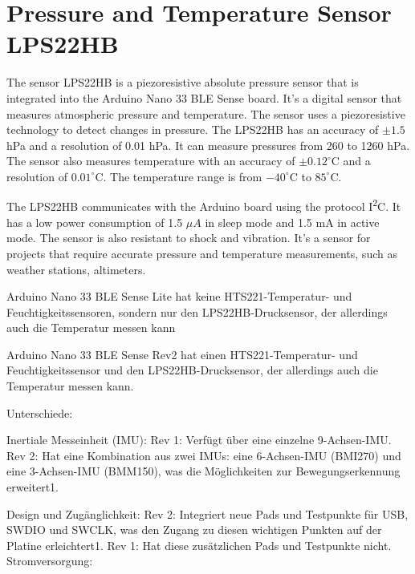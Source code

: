 %
%

\chapter{Pressure and Temperature Sensor LPS22HB}

The sensor LPS22HB is a piezoresistive absolute pressure sensor that is integrated into the Arduino Nano 33 BLE Sense board. It's a digital sensor that measures atmospheric pressure and temperature. The sensor uses a piezoresistive technology to detect changes in pressure. The LPS22HB has an accuracy of $\pm1.5$ hPa and a resolution of 0.01 hPa. It can measure pressures from 260 to 1260 hPa. The sensor also measures temperature with an accuracy of $\pm0.12^\circ$C and a resolution of $0.01^\circ$C. The temperature range is from $-40^\circ$C to $85^\circ$C. 

The LPS22HB communicates with the Arduino board using the protocol I\textsuperscript{2}C. It has a low power consumption of 1.5 $\mu A$ in sleep mode and 1.5 mA in active mode. The sensor is also resistant to shock and vibration. It's a sensor for projects that require accurate pressure and temperature measurements, such as weather stations, altimeters. \cite{Arduino:2023a,Arduino:2023}

Arduino Nano 33 BLE Sense Lite hat  keine HTS221-Temperatur- und Feuchtigkeitssensoren, sondern nur den LPS22HB-Drucksensor, der allerdings auch die Temperatur messen kann

Arduino Nano 33 BLE Sense Rev2 hat  einen HTS221-Temperatur- und Feuchtigkeitssensor und den LPS22HB-Drucksensor, der allerdings auch die Temperatur messen kann.


Unterschiede:

Inertiale Messeinheit (IMU):
Rev 1: Verfügt über eine einzelne 9-Achsen-IMU.
Rev 2: Hat eine Kombination aus zwei IMUs: eine 6-Achsen-IMU (BMI270) und eine 3-Achsen-IMU (BMM150), was die Möglichkeiten zur Bewegungserkennung erweitert1.

Design und Zugänglichkeit:
Rev 2: Integriert neue Pads und Testpunkte für USB, SWDIO und SWCLK, was den Zugang zu diesen wichtigen Punkten auf der Platine erleichtert1.
Rev 1: Hat diese zusätzlichen Pads und Testpunkte nicht.
Stromversorgung:

